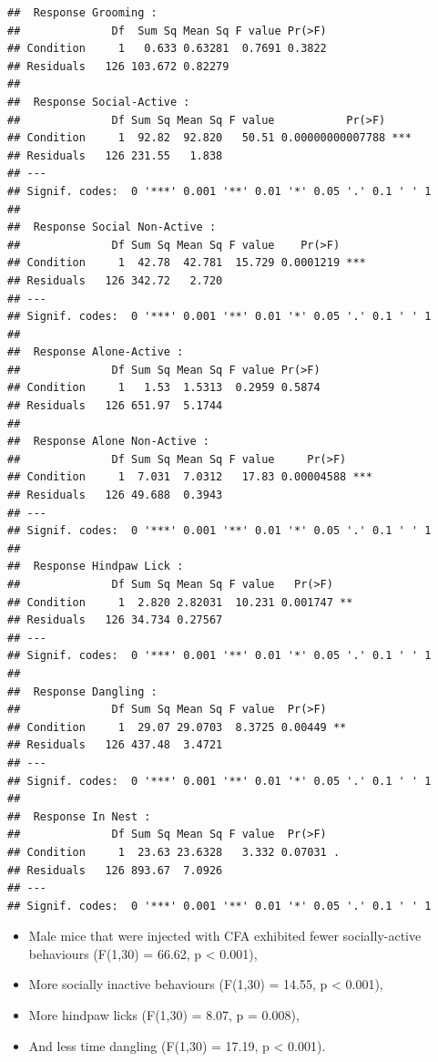 \documentclass[
]{book}
\providecommand{\tightlist}{%
  \setlength{\itemsep}{0pt}\setlength{\parskip}{0pt}}
\begin{document}
\begin{verbatim}
##  Response Grooming :
##              Df  Sum Sq Mean Sq F value Pr(>F)
## Condition     1   0.633 0.63281  0.7691 0.3822
## Residuals   126 103.672 0.82279               
## 
##  Response Social-Active :
##              Df Sum Sq Mean Sq F value           Pr(>F)    
## Condition     1  92.82  92.820   50.51 0.00000000007788 ***
## Residuals   126 231.55   1.838                             
## ---
## Signif. codes:  0 '***' 0.001 '**' 0.01 '*' 0.05 '.' 0.1 ' ' 1
## 
##  Response Social Non-Active :
##              Df Sum Sq Mean Sq F value    Pr(>F)    
## Condition     1  42.78  42.781  15.729 0.0001219 ***
## Residuals   126 342.72   2.720                      
## ---
## Signif. codes:  0 '***' 0.001 '**' 0.01 '*' 0.05 '.' 0.1 ' ' 1
## 
##  Response Alone-Active :
##              Df Sum Sq Mean Sq F value Pr(>F)
## Condition     1   1.53  1.5313  0.2959 0.5874
## Residuals   126 651.97  5.1744               
## 
##  Response Alone Non-Active :
##              Df Sum Sq Mean Sq F value     Pr(>F)    
## Condition     1  7.031  7.0312   17.83 0.00004588 ***
## Residuals   126 49.688  0.3943                       
## ---
## Signif. codes:  0 '***' 0.001 '**' 0.01 '*' 0.05 '.' 0.1 ' ' 1
## 
##  Response Hindpaw Lick :
##              Df Sum Sq Mean Sq F value   Pr(>F)   
## Condition     1  2.820 2.82031  10.231 0.001747 **
## Residuals   126 34.734 0.27567                    
## ---
## Signif. codes:  0 '***' 0.001 '**' 0.01 '*' 0.05 '.' 0.1 ' ' 1
## 
##  Response Dangling :
##              Df Sum Sq Mean Sq F value  Pr(>F)   
## Condition     1  29.07 29.0703  8.3725 0.00449 **
## Residuals   126 437.48  3.4721                   
## ---
## Signif. codes:  0 '***' 0.001 '**' 0.01 '*' 0.05 '.' 0.1 ' ' 1
## 
##  Response In Nest :
##              Df Sum Sq Mean Sq F value  Pr(>F)  
## Condition     1  23.63 23.6328   3.332 0.07031 .
## Residuals   126 893.67  7.0926                  
## ---
## Signif. codes:  0 '***' 0.001 '**' 0.01 '*' 0.05 '.' 0.1 ' ' 1
\end{verbatim}

\begin{itemize}
\tightlist
\item
  Male mice that were injected with CFA exhibited fewer socially-active behaviours (F(1,30) = 66.62, p \textless{} 0.001),
\item
  More socially inactive behaviours (F(1,30) = 14.55, p \textless{} 0.001),
\item
  More hindpaw licks (F(1,30) = 8.07, p = 0.008),
\item
  And less time dangling (F(1,30) = 17.19, p \textless{} 0.001).
\end{itemize}
\end{document}
